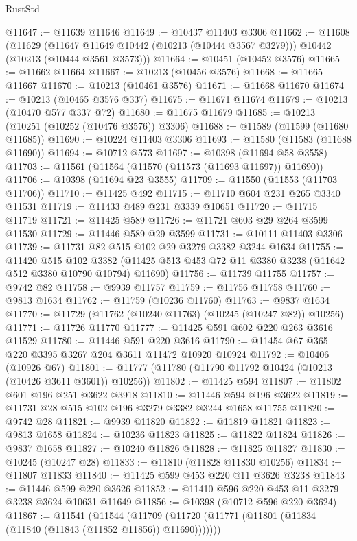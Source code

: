 \begin{lexlean}{RustStd}
\begin{coremodule}
@11647 := @11639 @11646
@11649 := @10437 @11403 @3306
@11662 := @11608
    (@11629
      (@11647 @11649 @10442 (@10213 (@10444 @3567 @3279)))
      @10442
      (@10213 (@10444 @3561 @3573)))
@11664 := @10451 (@10452 @3576)
@11665 := @11662 @11664
@11667 := @10213 (@10456 @3576)
@11668 := @11665 @11667
@11670 := @10213 (@10461 @3576)
@11671 := @11668 @11670
@11674 := @10213 (@10465 @3576 @337)
@11675 := @11671 @11674
@11679 := @10213 (@10470 @577 @337 @72)
@11680 := @11675 @11679
@11685 := @10213 (@10251 (@10252 (@10476 @3576)) @3306)
@11688 := @11589 (@11599 (@11680 @11685))
@11690 := @10224 @11403 @3306
@11693 := @11580 (@11583 (@11688 @11690))
@11694 := @10712 @573
@11697 := @10398 (@11694 @58 @3558)
@11703 := @11561 (@11564 (@11570 (@11573 (@11693 @11697)) @11690))
@11706 := @10398 (@11694 @23 @3555)
@11709 := @11550 (@11553 (@11703 @11706))
@11710 := @11425 @492
@11715 := @11710 @604 @231 @265 @3340 @11531
@11719 := @11433 @489 @231 @3339 @10651
@11720 := @11715 @11719
@11721 := @11425 @589
@11726 := @11721 @603 @29 @264 @3599 @11530
@11729 := @11446 @589 @29 @3599
@11731 := @10111 @11403 @3306
@11739 := @11731 @82 @515 @102 @29 @3279 @3382 @3244 @1634
@11755 := @11420
    @515
    @102
    @3382
    (@11425 @513 @453 @72 @11 @3380 @3238 (@11642 @512 @3380 @10790 @10794) @11690)
@11756 := @11739 @11755
@11757 := @9742 @82
@11758 := @9939 @11757
@11759 := @11756 @11758
@11760 := @9813 @1634
@11762 := @11759 (@10236 @11760)
@11763 := @9837 @1634
@11770 := @11729 (@11762 (@10240 @11763) (@10245 (@10247 @82)) @10256)
@11771 := @11726 @11770
@11777 := @11425 @591 @602 @220 @263 @3616 @11529
@11780 := @11446 @591 @220 @3616
@11790 := @11454 @67 @365 @220 @3395 @3267 @204 @3611 @11472 @10920 @10924
@11792 := @10406 (@10926 @67)
@11801 := @11777 (@11780 (@11790 @11792 @10424 (@10213 (@10426 @3611 @3601)) @10256))
@11802 := @11425 @594
@11807 := @11802 @601 @196 @251 @3622 @3918
@11810 := @11446 @594 @196 @3622
@11819 := @11731 @28 @515 @102 @196 @3279 @3382 @3244 @1658 @11755
@11820 := @9742 @28
@11821 := @9939 @11820
@11822 := @11819 @11821
@11823 := @9813 @1658
@11824 := @10236 @11823
@11825 := @11822 @11824
@11826 := @9837 @1658
@11827 := @10240 @11826
@11828 := @11825 @11827
@11830 := @10245 (@10247 @28)
@11833 := @11810 (@11828 @11830 @10256)
@11834 := @11807 @11833
@11840 := @11425 @599 @453 @220 @11 @3626 @3238
@11843 := @11446 @599 @220 @3626
@11852 := @11410 @596 @220 @453 @11 @3279 @3238 @3624 @10631 @11649
@11856 := @10398 (@10712 @596 @220 @3624)
@11867 := @11541
    (@11544 (@11709 (@11720 (@11771 (@11801 (@11834 (@11840 (@11843 (@11852 @11856)) @11690)))))))

\end{coremodule}
\end{lexlean}
